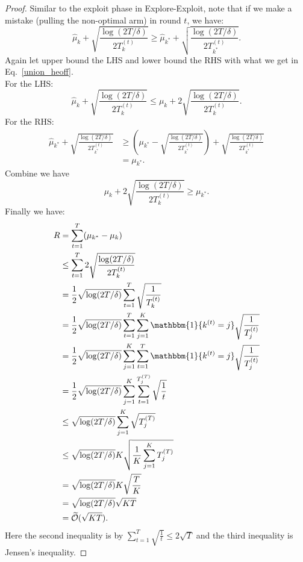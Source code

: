 \documentclass[11pt]{article}
\begin{document}
\begin{proof}
Similar to the exploit phase in Explore-Exploit, note that if we make a mistake (pulling the non-optimal arm) in round $t$, we have:
\[\widehat{\mu}_{k} + \sqrt{\frac{\log(2T/\delta)}{2T^{(t)}_{k}}} \geq \widehat{\mu}_{k^{\ast}} + \sqrt{\frac{\log(2T/\delta)}{2T^{(t)}_{k^{\ast}}}}.\]
Again let upper bound the LHS and lower bound the RHS with what we get in Eq.~\ref{union_heoff}.\\
For the LHS:
\[\widehat{\mu}_{k} + \sqrt{\frac{\log(2T/\delta)}{2T^{(t)}_{k}}} \leq \mu_{k} + 2\sqrt{\frac{\log(2T/\delta)}{2T^{(t)}_{k}}}.\]
For the RHS:
\begin{align*}
    \widehat{\mu}_{k^{\ast}} + \sqrt{\frac{\log(2T/\delta)}{2T^{(t)}_{k^{\ast}}}} &\geq \left(\mu_{k^{\ast}} - \sqrt{\frac{\log(2T/\delta)}{2T^{(t)}_{k^{\ast}}}}\right) + \sqrt{\frac{\log(2T/\delta)}{2T^{(t)}_{k^{\ast}}}} \\
    &= \mu_{k^{\ast}} .
\end{align*}
Combine we have
\[\mu_{k} + 2\sqrt{\frac{\log(2T/\delta)}{2T^{(t)}_{k}}} \geq \mu_{k^{\ast}} .\]
Finally we have:
\begin{align*}
    R &= \sum_{t=1}^T (\mu_{k^{\ast}}- \mu_{k})\\
    & \leq \sum_{t=1}^T 2\sqrt{\frac{\log(2T/\delta)}{2T^{(t)}_{k}}} \\
    &= \frac{1}{2}\sqrt{\log(2T/\delta)} \sum_{t=1}^T \sqrt{\frac{1}{T^{(t)}_{k}}} \\
    &= \frac{1}{2}\sqrt{\log(2T/\delta)} \sum_{t=1}^T \sum_{j=1}^K \mathbbm{1}\{k^{(t)} = j\} \sqrt{\frac{1}{T^{(t)}_{j}}}\\
    &= \frac{1}{2}\sqrt{\log(2T/\delta)} \sum_{j=1}^K \sum_{t=1}^T  \mathbbm{1}\{k^{(t)} = j\} \sqrt{\frac{1}{T^{(t)}_{j}}}\\
    &= \frac{1}{2}\sqrt{\log(2T/\delta)} \sum_{j=1}^K \sum_{t=1}^{T^{(T)}_j} \sqrt{\frac{1}{t}}\\
    & \leq \sqrt{\log(2T/\delta)} \sum_{j=1}^K \sqrt{T^{(T)}_j}\\
     & \leq \sqrt{\log(2T/\delta)}  K \sqrt{\frac{1}{K}\sum_{j=1}^K T^{(T)}_j}\\
     & = \sqrt{\log(2T/\delta)}  K \sqrt{\frac{T}{K}}\\
     &= \sqrt{\log(2T/\delta)}  \sqrt{KT}\\
     &= \widetilde{\mathcal{O}}(\sqrt{KT}).
\end{align*}
Here the second inequality is by $\sum_{t=1}^T \sqrt{\frac{1}{t}} \leq 2\sqrt{T}$ and the third inequality is Jensen's inequality.
\end{proof}
\newpage
{


}


\end{document}
